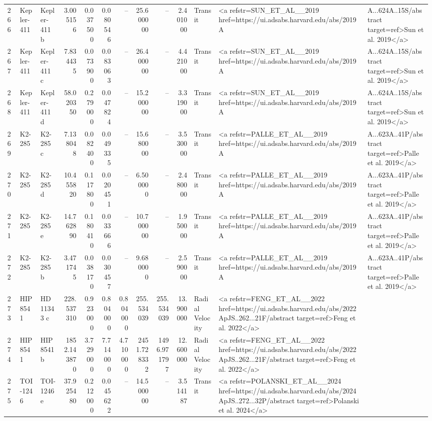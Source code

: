 \begin{tabular}{lllrrrrrrrll}
266 & Kepler-411 & Kepler-411 b & 3.005156 & 0.037500 & 0.080546 & -- & 25.600000 & -- & 2.401000 & Transit & <a refstr=SUN_ET_AL__2019 href=https://ui.adsabs.harvard.edu/abs/2019A&A...624A..15S/abstract target=ref>Sun et al. 2019</a> \\
267 & Kepler-411 & Kepler-411 c & 7.834435 & 0.073900 & 0.083063 & -- & 26.400000 & -- & 4.421000 & Transit & <a refstr=SUN_ET_AL__2019 href=https://ui.adsabs.harvard.edu/abs/2019A&A...624A..15S/abstract target=ref>Sun et al. 2019</a> \\
268 & Kepler-411 & Kepler-411 d & 58.020350 & 0.279000 & 0.047824 & -- & 15.200000 & -- & 3.319000 & Transit & <a refstr=SUN_ET_AL__2019 href=https://ui.adsabs.harvard.edu/abs/2019A&A...624A..15S/abstract target=ref>Sun et al. 2019</a> \\
269 & K2-285 & K2-285 c & 7.138048 & 0.082400 & 0.049335 & -- & 15.680000 & -- & 3.530000 & Transit & <a refstr=PALLE_ET_AL__2019 href=https://ui.adsabs.harvard.edu/abs/2019A&A...623A..41P/abstract target=ref>Palle et al. 2019</a> \\
270 & K2-285 & K2-285 d & 10.455820 & 0.117800 & 0.020451 & -- & 6.500000 & -- & 2.480000 & Transit & <a refstr=PALLE_ET_AL__2019 href=https://ui.adsabs.harvard.edu/abs/2019A&A...623A..41P/abstract target=ref>Palle et al. 2019</a> \\
271 & K2-285 & K2-285 e & 14.762890 & 0.180410 & 0.033666 & -- & 10.700000 & -- & 1.950000 & Transit & <a refstr=PALLE_ET_AL__2019 href=https://ui.adsabs.harvard.edu/abs/2019A&A...623A..41P/abstract target=ref>Palle et al. 2019</a> \\
272 & K2-285 & K2-285 b & 3.471745 & 0.038170 & 0.030457 & -- & 9.680000 & -- & 2.590000 & Transit & <a refstr=PALLE_ET_AL__2019 href=https://ui.adsabs.harvard.edu/abs/2019A&A...623A..41P/abstract target=ref>Palle et al. 2019</a> \\
273 & HIP 8541 & HD 11343 c & 228.537310 & 0.923000 & 0.804000 & 0.804000 & 255.534039 & 255.534039 & 13.900000 & Radial Velocity & <a refstr=FENG_ET_AL__2022 href=https://ui.adsabs.harvard.edu/abs/2022ApJS..262...21F/abstract target=ref>Feng et al. 2022</a> \\
274 & HIP 8541 & HIP 8541 b & 1852.143870 & 3.729000 & 7.714000 & 4.710000 & 2451.728332 & 1496.971797 & 12.600000 & Radial Velocity & <a refstr=FENG_ET_AL__2022 href=https://ui.adsabs.harvard.edu/abs/2022ApJS..262...21F/abstract target=ref>Feng et al. 2022</a> \\
275 & TOI-1246 & TOI-1246 e & 37.925480 & 0.212000 & 0.045622 & -- & 14.500000 & -- & 3.514187 & Transit & <a refstr=POLANSKI_ET_AL__2024 href=https://ui.adsabs.harvard.edu/abs/2024ApJS..272...32P/abstract target=ref>Polanski et al. 2024</a> \\

\end{tabular}
